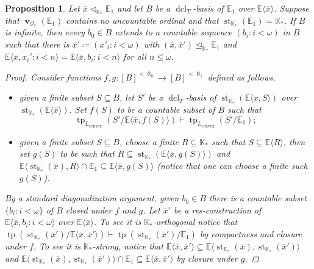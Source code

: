 \documentclass{amsart}
\newtheorem{proposition}[theorem]{Proposition}
\theoremstyle{remark}
\theoremstyle{definition}
\theoremstyle{plain}
\newcommand{\bE}{\mathbb E}
\newcommand{\bK}{\mathbb K}
\newcommand{\cO}{\mathcal O}
\newcommand{\convex}{\mathrm{convex}}
\DeclareMathOperator{\val}{\mathbf{v}}
\DeclareMathOperator{\std}{\mathrm{st}}
\DeclareMathOperator{\tp}{\mathrm{tp}}
\DeclareMathOperator{\dcl}{\mathrm{dcl}}
\theoremstyle{plain}
\begin{document}
\begin{proposition}\label{prop:extending_strong}
    Let $\overline{x}\triangleleft_{\bK_*} \bE_1$ and let $B$ be a $\dcl_T$-basis of $\bE_1$ over $\bE \langle \overline{x}\rangle$. Suppose that $\val_{\cO_*}(\bE_1)$ contains no uncountable ordinal and that $\std_{\bK_*}(\bE_1)=\bK_*$. If $B$ is infinite, then every $b_0 \in B$ extends to a countable sequence $(b_i: i <\omega)$ in $B$ such that there is $\overline{x}'\coloneqq (x'_i: i < \omega)$ with $(\overline{x},\overline{x}') \trianglelefteq_{\bK_*} \bE_1$ and $\bE \langle \overline{x} ,x_i' :i<n\rangle=\bE \langle \overline{x}, b_i: i<n\rangle$ for all $n\le \omega$.
    \begin{proof}
        Consider functions $f, g: [B]^{<\aleph_0} \to [B]^{<\aleph_1}$ defined as follows. 
        \begin{itemize}
            \item given a finite subset $S\subseteq B$, let $S'$ be a $\dcl_T$-basis of $\std_{\bK_*}(\bE \langle \overline{x}, S\rangle)$ over $\std_{\bK_*}(\bE \langle \overline{x} \rangle)$. Set $f(S)$ to be a countable subset of $B$ such that
            \[\tp_{L_{\convex}}(S'/\bE\langle \overline{x}, f(S) \rangle)\vdash \tp_{L_{\convex}}(S'/\bE_1);\]
            \item given a finite subset $S\subseteq B$, choose a finite $R\subseteq \bK_*$ such that $S\subseteq \bE\langle R\rangle$, then set $g(S)$ to be such that $R \subseteq \std_{\bK_*}(\bE \langle \overline{x}, g(S)\rangle)$ and $\bE \langle \std_{\bK_*}(\overline{x}) , R\rangle \cap \bE_1 \subseteq \bE \langle \overline{x}, g(S) \rangle$ (notice that one can choose a finite such $g(S)$).
        \end{itemize}
        By a standard diagonalization argument, given $b_0 \in B$ there is a countable subset $\{b_i: i < \omega\}$ of $B$ closed under $f$ and $g$. Let $\overline{x}'$ be a res-construction of $\bE \langle \overline{x}, b_i: i< \omega\rangle$ over $\bE \langle \overline{x} \rangle$. To see it is $\bK_*$-orthogonal notice that $\tp(\std_{\bK_*}(\overline{x}')/\bE \langle \overline{x}, \overline{x}' \rangle)\vdash \tp(\std_{\bK_*}(\overline{x}')/\bE_1)$ by compactness and closure under $f$. To see it is $\bK_*$-strong, notice that $\bE \langle \overline{x}, \overline{x}' \rangle \subseteq \bE \langle \std_{\bK_*}(\overline{x}), \std_{\bK_*}(\overline{x}')\rangle$ and $\bE \langle \std_{\bK_*}(\overline{x}), \std_{\bK_*}(\overline{x}')\rangle \cap \bE_1 \subseteq \bE \langle \overline{x}, \overline{x}' \rangle$ by closure under $g$.
    \end{proof}
\end{proposition}
\end{document}
